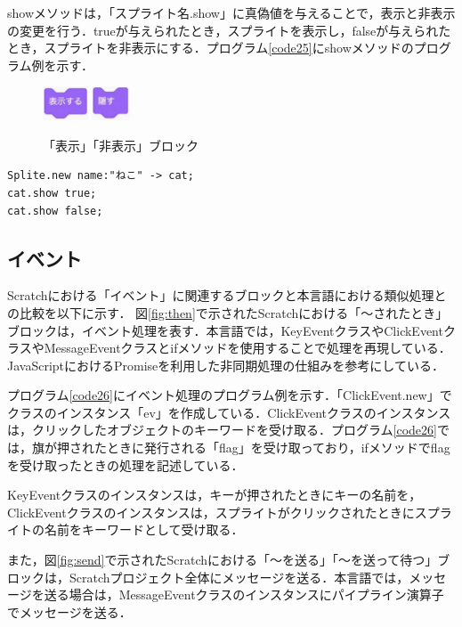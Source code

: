\documentclass[10pt,a4j]{ltjsarticle}
\begin{document}
showメソッドは，「スプライト名.show」に真偽値を与えることで，表示と非表示の変更を行う．trueが与えられたとき，スプライトを表示し，falseが与えられたとき，スプライトを非表示にする．プログラム\ref{code25}にshowメソッドのプログラム例を示す．

\begin{figure}[H]
  \centering
  \includegraphics[height=10mm]{images/show.pdf} 
  \includegraphics[height=10mm]{images/hide.pdf}
  \caption{「表示」「非表示」ブロック}
  \label{fig:show}
\end{figure}

\begin{lstlisting}[caption=showメソッドのプログラム例, label=code25]
Splite.new name:"ねこ" -> cat;
cat.show true;
cat.show false;
\end{lstlisting}

\subsection{イベント}
Scratchにおける「イベント」に関連するブロックと本言語における類似処理との比較を以下に示す．
図\ref{fig:then}で示されたScratchにおける「〜されたとき」ブロックは，イベント処理を表す．本言語では，KeyEventクラスやClickEventクラスやMessageEventクラスとifメソッドを使用することで処理を再現している．JavaScriptにおけるPromiseを利用した非同期処理の仕組みを参考にしている．

プログラム\ref{code26}にイベント処理のプログラム例を示す．「ClickEvent.new」でクラスのインスタンス「ev」を作成している．ClickEventクラスのインスタンスは，クリックしたオブジェクトのキーワードを受け取る．プログラム\ref{code26}では，旗が押されたときに発行される「flag」を受け取っており，ifメソッドでflagを受け取ったときの処理を記述している．

KeyEventクラスのインスタンスは，キーが押されたときにキーの名前を，ClickEventクラスのインスタンスは，スプライトがクリックされたときにスプライトの名前をキーワードとして受け取る．

また，図\ref{fig:send}で示されたScratchにおける「〜を送る」「〜を送って待つ」ブロックは，Scratchプロジェクト全体にメッセージを送る．本言語では，メッセージを送る場合は，MessageEventクラスのインスタンスにパイプライン演算子でメッセージを送る．
\end{document}
